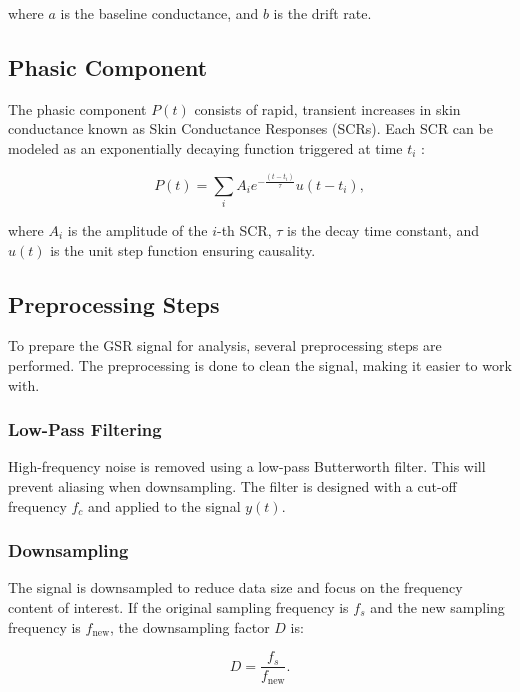 \documentclass[twocolumn]{article}
\begin{document}
where \( a \) is the baseline conductance, and \( b \) is the drift rate.

\subsection*{Phasic Component}

The phasic component \( P(t) \) consists of rapid, transient increases in skin conductance known as Skin Conductance Responses (SCRs). Each SCR can be modeled as an exponentially decaying function triggered at time \( t_i \) \cite{Dawson2007,Boucsein2012,Braithwaite2013}:

\begin{equation}
P(t) = \sum_{i} A_i e^{-\frac{(t - t_i)}{\tau}} u(t - t_i),
\end{equation}

where \( A_i \) is the amplitude of the \( i \)-th SCR, \( \tau \) is the decay time constant, and \( u(t) \) is the unit step function ensuring causality.

\subsection*{Preprocessing Steps}

To prepare the GSR signal for analysis, several preprocessing steps are performed. The preprocessing is done to clean the signal, making it easier to work with.

\subsubsection*{Low-Pass Filtering}

High-frequency noise is removed using a low-pass Butterworth filter. This will prevent aliasing when downsampling. The filter is designed with a cut-off frequency \( f_c \) and applied to the signal \( y(t) \).

\subsubsection*{Downsampling}

The signal is downsampled to reduce data size and focus on the frequency content of interest. If the original sampling frequency is \( f_s \) and the new sampling frequency is \( f_{\text{new}} \), the downsampling factor \( D \) is:

\begin{equation}
D = \frac{f_s}{f_{\text{new}}}.
\end{equation}
\end{document}

